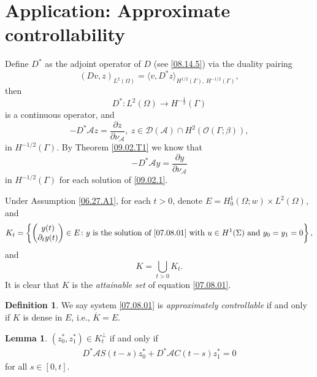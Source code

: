 \documentclass[preprint,12pt]{elsarticle}
\theoremstyle{definition}   %
\newtheorem{lemma}[theorem]{Lemma}
\newtheorem{definition}[theorem]{Definition}
\numberwithin{equation}{section}
\def\pt{\partial}
\def\ra{\rightarrow}
\def\bu{\bigcup}
\def\pt{\partial}
\def\Om{\Omega}
\def\be{\beta}
\def\Ga{\Gamma}
\def\ts{\times}
\def\f{\frac}
\def\mcO{\mathcal{O}}
\def\mcA{\mathcal{A}}
\def\mcD{\mathcal{D}}
\begin{document}
\section{Application: Approximate controllability}\label{S3}


Define $D^*$ as the adjoint operator of $D$ (see \eqref{08.14.5}) via the duality pairing
\begin{equation*}
	(Dv, z)_{L^2(\Om)}=\langle v, D^*z\rangle_{H^{1/2}(\Ga),\,H^{-1/2}(\Ga)}, 
\end{equation*}
then
\begin{equation*}
	D^*: L^2(\Om)\ra H^{-\f{1}{2}}(\Ga)
\end{equation*}
is a continuous operator, and  
\begin{equation*}
	-D^*\mcA z=\f{\pt z}{\pt\nu_\mcA}, \ z\in \mcD(\mcA)\cap H^2(\mcO(\Ga;\be)), 
\end{equation*}
in $H^{-1/2}(\Ga)$. By Theorem \ref{09.02.T1} we know that 
\begin{equation*}
	-D^*\mcA y=\f{\pt y}{\pt\nu_\mcA}
\end{equation*}
in $H^{-1/2}(\Ga)$ for each solution of \eqref{09.02.1}. 

Under Assumption \ref{06.27.A1}, for each $t>0$, denote  $E=H_0^1(\Om;w)\ts L^2(\Om)$, and 
\begin{equation*}
	K_t=\left\{
	\begin{pmatrix}
		y(t)\\
		\pt_ty(t)
	\end{pmatrix}\in E\colon y \mbox{ is the solution of  } \eqref{07.08.01} \mbox{ with } u\in H^1(\Sigma) \mbox{ and } y_0=y_1=0\right\}, 
\end{equation*}
and 
\begin{equation*}
	K=\bu_{t>0}K_t. 
\end{equation*}
It is clear that $K$ is the {\it attainable set} of equation \eqref{07.08.01}. 

\begin{definition}\label{09.14.D1}
	We say system \eqref{07.08.01} is {\it approximately controllable} if and only if $K$ is dense in $E$, i.e., $\overline{K}=E$. 
\end{definition}

\begin{lemma}\label{09.14.L1}
	$(z_0^*,z_1^*)\in K_t^\bot$ if and only if 
	\begin{equation*}
		\begin{split}
			D^*\mcA S(t-s)z_0^*+D^*\mcA C(t-s)z_1^*=0
		\end{split}
	\end{equation*}
	for all $s\in [0,t]$. 
\end{lemma}
\end{document}
